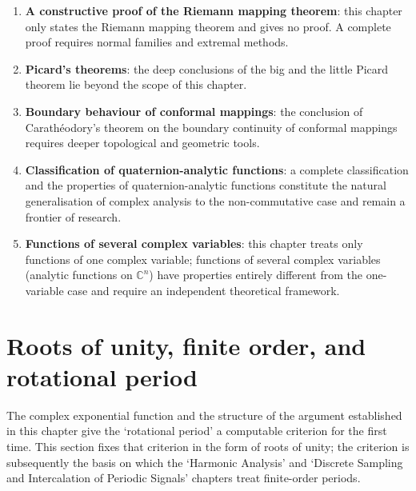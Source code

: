 \begin{remark}\label{rem:ca_open}
\begin{enumerate}[label=(\roman*)]
    \item \textbf{A constructive proof of the Riemann mapping theorem}: this chapter only states the Riemann mapping theorem and gives no proof. A complete proof requires normal families and extremal methods.
    \item \textbf{Picard's theorems}: the deep conclusions of the big and the little Picard theorem lie beyond the scope of this chapter.
    \item \textbf{Boundary behaviour of conformal mappings}: the conclusion of Carathéodory's theorem on the boundary continuity of conformal mappings requires deeper topological and geometric tools.
    \item \textbf{Classification of quaternion-analytic functions}: a complete classification and the properties of quaternion-analytic functions constitute the natural generalisation of complex analysis to the non-commutative case and remain a frontier of research.
    \item \textbf{Functions of several complex variables}: this chapter treats only functions of one complex variable; functions of several complex variables (analytic functions on $\mathbb{C}^n$) have properties entirely different from the one-variable case and require an independent theoretical framework.
\end{enumerate}
\end{remark}

\section{Roots of unity, finite order, and rotational period}
\label{sec:unit_roots_rotation_period}

The complex exponential function and the structure of the argument established in this chapter give the `rotational period' a computable criterion for the first time. This section fixes that criterion in the form of roots of unity; the criterion is subsequently the basis on which the `Harmonic Analysis' and `Discrete Sampling and Intercalation of Periodic Signals' chapters treat finite-order periods.

